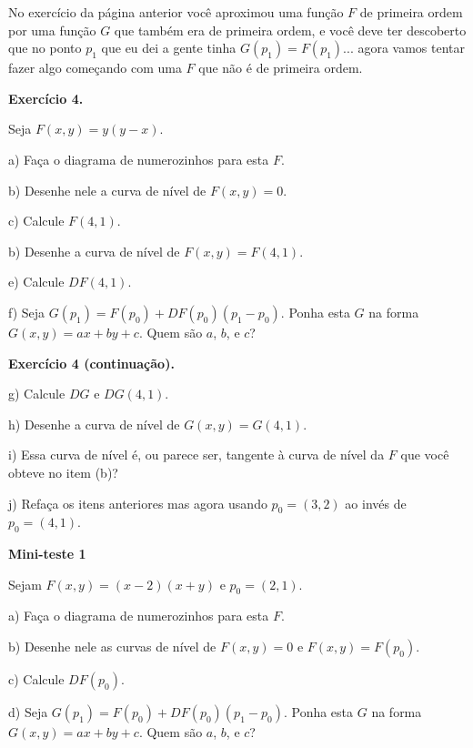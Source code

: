 \documentclass[oneside,12pt]{article}
\begin{document}
No exercício da página anterior você aproximou uma função $F$ de
primeira ordem por uma função $G$ que também era de primeira ordem, e
você deve ter descoberto que no ponto $p_1$ que eu dei a gente tinha
$G(p_1) = F(p_1)$... agora vamos tentar fazer algo 
começando com uma $F$ que não é de primeira ordem.

\bsk

{\bf Exercício 4.}

\ssk

Seja $F(x,y) = y(y-x)$.

a) Faça o diagrama de numerozinhos para esta $F$.

b) Desenhe nele a curva de nível de $F(x,y)=0$.

c) Calcule $F(4,1)$.

b) Desenhe a curva de nível de $F(x,y)=F(4,1)$.

e) Calcule $DF(4,1)$.

f) Seja $G(p_1) = F(p_0) + DF(p_0) (p_1 - p_0)$. Ponha esta $G$ na
forma $G(x,y) = ax + by + c$. Quem são $a$, $b$, e $c$?

\newpage

{\bf Exercício 4 (continuação).}

\ssk

g) Calcule $DG$ e $DG(4,1)$.

h) Desenhe a curva de nível de $G(x,y)=G(4,1)$.

i) Essa curva de nível é, ou parece ser, tangente à curva de nível da
$F$ que você obteve no item (b)?

\bsk

j) Refaça os itens anteriores mas agora usando $p_0 = (3,2)$ ao invés
de $p_0 = (4,1)$.



\newpage


{\bf Mini-teste 1}

\ssk

Sejam $F(x,y) = (x-2)(x+y)$ e $p_0 = (2,1)$.

a) Faça o diagrama de numerozinhos para esta $F$.

b) Desenhe nele as curvas de nível de $F(x,y)=0$ e $F(x,y) = F(p_0)$.

c) Calcule $DF(p_0)$.

d) Seja $G(p_1) = F(p_0) + DF(p_0) (p_1 - p_0)$. Ponha esta $G$ na
forma $G(x,y) = ax + by + c$. Quem são $a$, $b$, e $c$?
\end{document}
